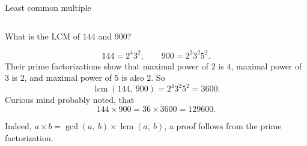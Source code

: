 \documentclass[9pt,aspectratio=169]{beamer}
\DeclareMathOperator{\lcm}{lcm}
\begin{document}
\begin{frame}{Least common multiple}
\begin{columns}[T]
\begin{column}{0.5\textwidth}
      \begin{definition}
        What is the LCM of $144$ and $900$?        
      \end{definition}
      \vspace*{-1em}
      \[ 144 = 2^4 3^2, \qquad 900 =2^2 3^2 5^2. \]  
      Their prime factorizations show that maximal power of $2$ is $4$, maximal power of $3$ is $2$, and maximal power of $5$ is also $2$. So 
      \[ \lcm(144,\ 900) = 2^4 3^2 5^2 = 3600. \] 
      Curious mind probably noted, that 
      \[ 144 \times 900 = 36 \times 3600 = 129600. \]
      \vspace*{-1\baselineskip}
      \begin{definition}
        Indeed, $a \times b = \gcd(a,\ b) \times \lcm(a,\ b)$, a proof follows from the prime factorization.
      \end{definition}
    \end{column}
  \end{columns}
\end{frame}
\end{document}
